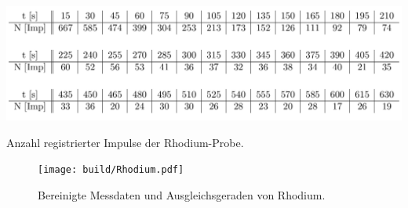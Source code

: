\begin{table}
\centering
\includegraphics[width=\textwidth]{data/Rhodium.png}
\caption{Anzahl registrierter Impulse der Rhodium-Probe.}
\label{tab:R}
\end{table}

\begin{figure}
\centering
\texttt{[image: build/Rhodium.pdf]}
\caption{Bereinigte Messdaten und Ausgleichsgeraden von Rhodium.}
\label{fig:R}
\end{figure}


%
